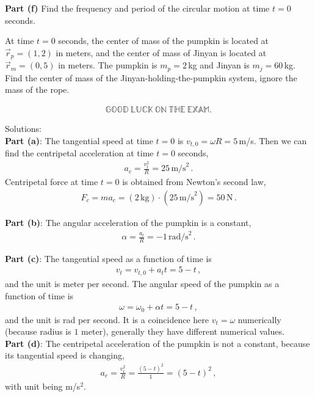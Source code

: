 \documentclass[11pt]{article}
\begin{document}
\noindent\textbf{Part (f)} Find the frequency and period of the circular motion at time $t = 0$ seconds. 
\hfill\break\hfill\break
\hfill\break\hfill\break
\hfill\break\hfill\break


At time $t = 0$ seconds, the center of mass of the pumpkin is located at $\vec{r}_p = (1,2)$ in meters, and the center of mass of Jinyan is located at $\vec{r}_m = (0,5)$ in meters. The pumpkin is $m_p=2$\,kg and Jinyan is $m_j=60$\,kg. Find the center of mass of the Jinyan-holding-the-pumpkin system, ignore the mass of the rope. 

\vfill
\begin{align*}
\mathbb{GOOD\ LUCK\ ON\ THE\ EXAM}.
\end{align*}

\newpage
Solutions:\\

\textbf{Part (a)}: The tangential speed at time $t= 0$ is $v_{t,0} = \omega R = 5$\,m/s. Then we can find the centripetal acceleration at time $t = 0$ seconds,
\begin{align*}
a_c = \frac{v_t^2}{R} = 25\,\text{m/s}^2\,.
\end{align*}
Centripetal force at time $t = 0$ is obtained from Newton's second law, 
\begin{align*}
F_c = ma_c = (2\,\text{kg}) \cdot (25\,\text{m/s}^2) = 50\,\text{N}\,.
\end{align*}

\textbf{Part (b)}: The angular acceleration of the pumpkin is a constant,
\begin{align*}
\alpha = \frac{a_t}{R} = -1 \,\text{rad/s}^2\,.
\end{align*}

\textbf{Part (c)}: The tangential speed as a function of time is 
\begin{align*}
v_t = v_{t,0} + a_t t = 5 -t\,,
\end{align*}
and the unit is meter per second. The angular speed of the pumpkin as a function of time is 
\begin{align*}
\omega = \omega_0 + \alpha t = 5 -t\,,
\end{align*}
and the unit is rad per second. It is a coincidence here $v_t = \omega$ numerically (because radius is $1$ meter), generally they have different numerical values. \\

\textbf{Part (d)}: The centripetal acceleration of the pumpkin is not a constant, because its tangential speed is changing, 
\begin{align*}
a_{c} = \frac{v_t^2}{R} = \frac{(5-t)^2}{1} = (5-t)^2\,,
\end{align*}  
with unit being m/s$^2$. \\
\end{document}
